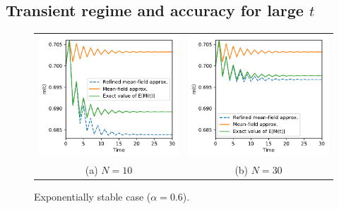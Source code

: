 \documentclass{elsarticle}
\begin{document}
\subsection{Transient regime and accuracy for large $t$}

\begin{figure}[ht]
  \centering
  \begin{tabular}{@{}c@{}c@{}}
    \includegraphics[width=.5\linewidth]{unstable1D_a60_N10}
    &\includegraphics[width=.5\linewidth]{unstable1D_a60_N30}\\
    (a) $N=10$ & (b) $N=30$
  \end{tabular}
  \caption{Exponentially stable case ($\alpha=0.6$).}
  \label{fig:stable}
\end{figure}
\end{document}

